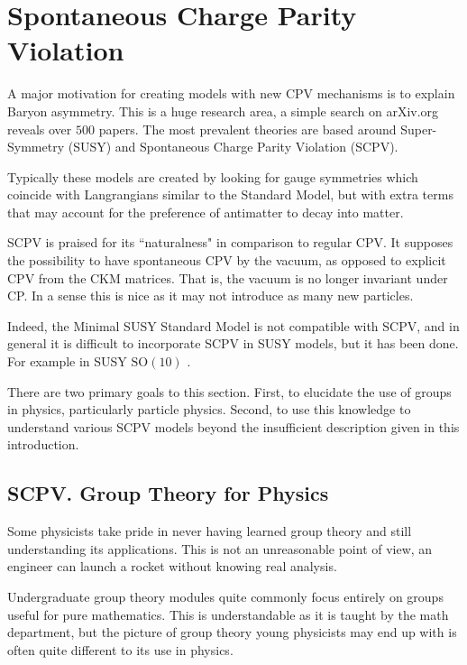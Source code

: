 \documentclass[twocolumn,floatfix,aps,prd,amsmath,amssymb]{revtex4}
\begin{document}
\section{Spontaneous Charge Parity Violation} 
A major motivation for creating models with new CPV mechanisms is to explain Baryon asymmetry. This is a huge research area, a simple search on arXiv.org reveals over $500$ papers. The most prevalent theories are based around Super-Symmetry (SUSY) and Spontaneous Charge Parity Violation (SCPV). 

Typically these models are created by looking for gauge symmetries which coincide with Langrangians similar to the Standard Model, but with extra terms that may account for the preference of antimatter to decay into matter.  

SCPV is praised for its ``naturalness" in comparison to regular CPV\cite{SCPV1}. It supposes the possibility to have spontaneous CPV by the vacuum, as opposed to explicit CPV from the CKM matrices. That is, the vacuum is no longer invariant under CP. In a sense this is nice as it may not introduce as many new particles.

Indeed, the Minimal SUSY Standard Model is not compatible with SCPV, and in general it is difficult to incorporate SCPV in SUSY models\cite{SCPV1}, but it has been done. For example in SUSY $\mathrm{SO}(10)$ \cite{SCPV2}.

There are two primary goals to this section. First, to elucidate the use of groups in physics, particularly particle physics. Second, to use this knowledge to understand various SCPV  models beyond the insufficient description given in this introduction.

\subsection{SCPV. Group Theory for Physics}
Some physicists take pride in never having learned group theory and still understanding its applications. This is not an unreasonable point of view, an engineer can launch a rocket without knowing real analysis. 

Undergraduate group theory modules quite commonly focus entirely on groups useful for pure mathematics. This is understandable as it is taught by the math department, but the picture of group theory young physicists may end up with is often quite different to its use in physics.
\end{document}
